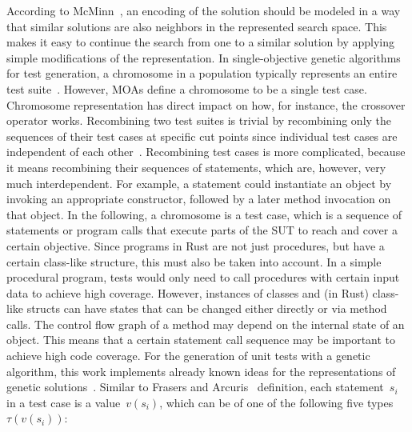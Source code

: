 \documentclass{article}
\begin{document}
According to McMinn~\cite{McMinn_2004}, an encoding of the solution should be modeled in a way that similar solutions are also neighbors in the represented search space. This makes it easy to continue the search from one to a similar solution by applying simple modifications of the representation. In single-objective genetic algorithms for test generation, a chromosome in a population typically represents an entire test suite~\cite{Fraser_2011, Campos2017}. However, \acp{MOA} define a chromosome to be a single test case. Chromosome representation has direct impact on how, for instance, the crossover operator works. Recombining two test suites is trivial by recombining only the sequences of their test cases at specific cut points since individual test cases are independent of each other~\cite{Fraser_2013}. Recombining test cases is more complicated, because it means recombining their sequences of statements, which are, however, very much interdependent. For example, a statement could instantiate an object by invoking an appropriate constructor, followed by a later method invocation on that object. In the following, a chromosome is a test case, which is a sequence of statements or program calls that execute parts of the \ac{SUT} to reach and cover a certain objective. Since programs in Rust are not just procedures, but have a certain class-like structure, this must also be taken into account. In a simple procedural program, tests would only need to call procedures with certain input data to achieve high coverage. However, instances of classes and (in Rust) class-like structs can have states that can be changed either directly or via method calls. The control flow graph of a method may depend on the internal state of an object. This means that a certain statement call sequence may be important to achieve high code coverage. For the generation of unit tests with a genetic algorithm, this work implements already known ideas for the representations of genetic solutions~\cite{Fraser2012,Tonella2004,Arcuri2008}. Similar to Frasers and Arcuris~\cite{Fraser_2011} definition, each statement~$s_i$ in a test case is a value~$v(s_i)$, which can be of one of the following five types~$\tau(v(s_i))$: 
\end{document}
